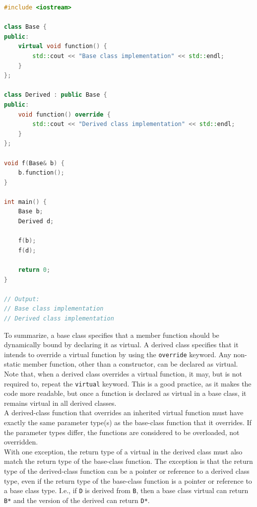 \begin{lstlisting}[language=C++]
#include <iostream>

class Base {
public:
    virtual void function() {
        std::cout << "Base class implementation" << std::endl;
    }
};

class Derived : public Base {
public:
    void function() override {
        std::cout << "Derived class implementation" << std::endl;
    }
};

void f(Base& b) {
    b.function();
}

int main() {
    Base b;
    Derived d;

    f(b);
    f(d);

    return 0;
}

// Output:
// Base class implementation
// Derived class implementation
\end{lstlisting}

To summarize, a base class specifies that a member function should be dynamically bound by
declaring it as virtual. A derived class specifies that it intends to override a virtual
function by using the \texttt{override} keyword. Any non-static member function, other than
a constructor, can be declared as virtual.\\

Note that, when a derived class overrides a virtual function, it may, but is not required to,
repeat the \texttt{virtual} keyword. This is a good practice, as it makes the code more readable, but 
once a function is declared as virtual in a base class, it remains virtual in all derived classes.\\

A derived-class function that overrides an inherited virtual function must have exactly the same 
parameter type(s) as the base-class function that it overrides. If the parameter types differ, the
functions are considered to be overloaded, not overridden.\\

With one exception, the return type of a virtual in the derived class must also match the return type
of the base-class function. The exception is that the return type of the derived-class function can be
a pointer or reference to a derived class type, even if the return type of the base-class function is
a pointer or reference to a base class type. I.e., if \texttt{D} is derived from \texttt{B}, then a base 
class virtual can return \texttt{B*} and the version of the derived can return \texttt{D*}.\\

